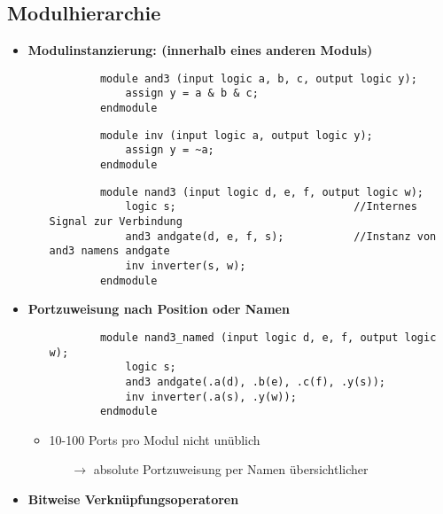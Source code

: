 \subsection{Modulhierarchie}
\begin{itemize}
\item \textbf{Modulinstanzierung: (innerhalb eines anderen Moduls)}
	\begin{itemize}
	
	\item[]
		\begin{lstlisting}
		module and3 (input logic a, b, c, output logic y);
			assign y = a & b & c;
		endmodule
		\end{lstlisting}		
	\item[]	
		\begin{lstlisting}
		module inv (input logic a, output logic y);
			assign y = ~a;
		endmodule
		\end{lstlisting}		
	\item[]
		\begin{lstlisting}
		module nand3 (input logic d, e, f, output logic w);
			logic s; 							//Internes Signal zur Verbindung
			and3 andgate(d, e, f, s);  			//Instanz von and3 namens andgate
			inv inverter(s, w);				
		endmodule
		\end{lstlisting}	
	\end{itemize}
	
\pagebreak	
	
\item \textbf{Portzuweisung nach Position oder Namen}
	\begin{itemize}
	\item[]
		\begin{lstlisting}
		module nand3_named (input logic d, e, f, output logic w);
			logic s;
			and3 andgate(.a(d), .b(e), .c(f), .y(s));
			inv inverter(.a(s), .y(w)); 	
		endmodule
		\end{lstlisting}
	\item 10-100 Ports pro Modul nicht unüblich
		\begin{itemize}
		\item[$\rightarrow$] absolute Portzuweisung per Namen übersichtlicher	
		\end{itemize}
		
	
	\end{itemize}
	
\item \textbf{Bitweise Verknüpfungsoperatoren}
	\begin{itemize}
	

\end{itemize}
\end{itemize}
